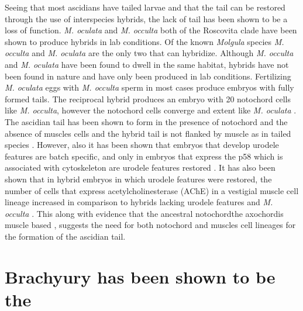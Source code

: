 Seeing that most ascidians have tailed larvae and that the tail can be restored through the use of interspecies hybrids, the lack of tail has been shown to be a loss of function. \textit{M. oculata} and \textit{M. occulta} both of the Roscovita clade have been shown to produce hybrids in lab conditions. Of the known \textit{Molgula} species \textit{M. occulta} and \textit{M. oculata} are the only two that can hybridize. Although \textit{M. occulta} and \textit{M. oculata} have been found to dwell in the same habitat, hybrids have not been found in nature and have only been produced in lab conditions. Fertilizing \textit{M. oculata} eggs with \textit{M. occulta} sperm in most cases produce embryos with fully formed tails. The reciprocal hybrid produces an embryo with 20 notochord cells like \textit{M. occulta}, however the notochord cells converge and extent like \textit{M. oculata} \cite{swalla_interspecific_1990}. The ascidian tail has been shown to form in the presence of notochord and the absence of muscles cells \cite{miyamoto_formation_1985} and the hybrid tail is not flanked by muscle as in tailed species \cite{swalla_novel_1993}. However, also it has been shown that embryos that develop urodele features are batch specific, and only in embryos that express the p58 which is associated with cytoskeleton are urodele features restored \cite{swalla_identification_1991,jeffery_factors_1992}. It has also been shown that in hybrid embryos in which urodele features were restored, the number of cells that express acetylcholinesterase (AChE) in a vestigial muscle cell lineage increased in comparison to hybrids lacking urodele features and \textit{M. occulta} \cite{jeffery_evolutionary_1991}. This along with evidence that the ancestral notochord\textemdash the axochord\textemdash is muscle based \cite{lauri_development_2014}, suggests the need for both notochord and muscles cell lineages for the formation of the ascidian tail. 

\section{Brachyury has been shown to be the  }

